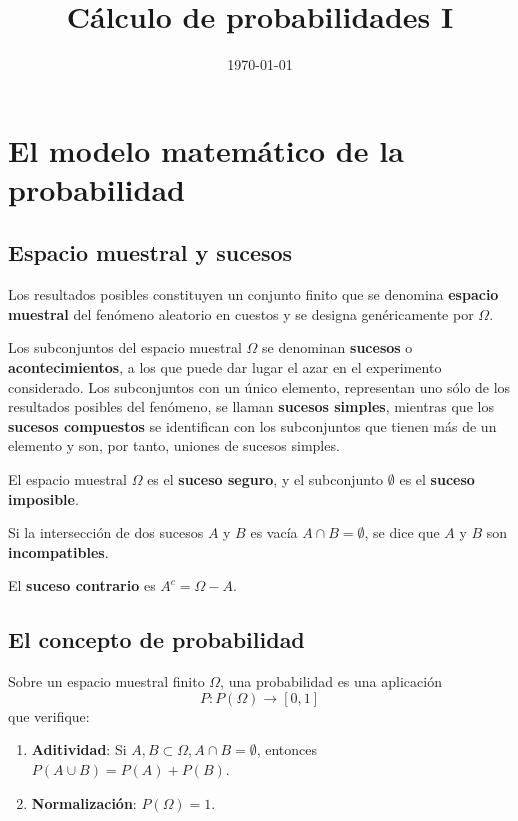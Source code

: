 \documentclass[12pt,a4paper,twoside]{memoir}
\title{Cálculo de probabilidades I}
\date{\today}
\theoremstyle{mystyle}
\begin{document}
\maketitle

\cleardoublepage

\tableofcontents

\chapter{El modelo matemático de la probabilidad}
\label{el-modelo-matemuxe1tico-de-la-probabilidad}

\section{Espacio muestral y sucesos}
\label{espacio-muest ral-y-sucesos}

Los resultados posibles constituyen un conjunto finito que se denomina \textbf{espacio muestral} del fenómeno aleatorio en cuestos y se designa
genéricamente por \(\Omega\).

Los subconjuntos del espacio muestral \(\Omega\) se denominan \textbf{sucesos} o \textbf{acontecimientos}, a los que puede dar lugar
el azar en el experimento considerado. Los subconjuntos con un único elemento, representan uno sólo de los resultados posibles del fenómeno,
se llaman \textbf{sucesos simples}, mientras que los \textbf{sucesos compuestos} se identifican con los subconjuntos que tienen más de un
elemento y son, por tanto, uniones de sucesos simples.

El espacio muestral \(\Omega\) es el \textbf{suceso seguro}, y el subconjunto \(\emptyset\) es el \textbf{suceso imposible}.

Si la intersección de dos sucesos \(A\) y \(B\) es vacía \(A \cap B = \emptyset\), se dice que \(A\) y \(B\) son
\textbf{incompatibles}.

El \textbf{suceso contrario} es \(A^c = \Omega - A\).

\section{El concepto de probabilidad}
\label{el-concepto-de-probabilidad}

Sobre un espacio muestral finito \(\Omega\), una probabilidad es una aplicación 
\[
  P : P(\Omega) \longrightarrow [0,1]
\] 
que verifique: 
\begin{enumerate}
  \item \textbf{Aditividad}: Si \(A, B \subset \Omega, A \cap B = \emptyset\), entonces \(P(A \cup B) = P(A) + P(B)\). 
  \item \textbf{Normalización}: \(P(\Omega) = 1\).
\end{enumerate}
\end{document}
